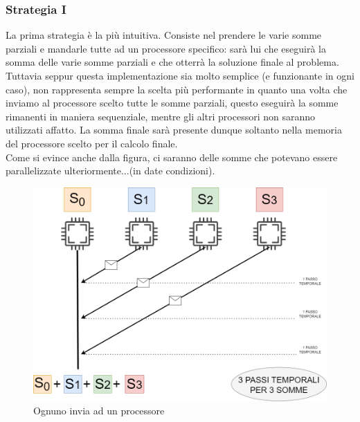 \documentclass{article}
\begin{document}
\subsubsection{Strategia I}
    La prima strategia è la più intuitiva.
    Consiste nel prendere le varie somme parziali e mandarle tutte ad un processore specifico: sarà lui che eseguirà la somma delle varie somme parziali e che otterrà la soluzione finale al problema.
    Tuttavia seppur questa implementazione sia molto semplice (e funzionante in ogni caso), non rappresenta sempre la scelta più performante in quanto una volta che inviamo al processore scelto tutte le somme parziali, questo eseguirà la somme rimanenti in maniera sequenziale, mentre gli altri processori non saranno utilizzati affatto. La somma finale sarà presente dunque soltanto nella memoria del processore scelto per il calcolo finale.\\
    Come si evince anche dalla figura, ci saranno delle somme che potevano essere parallelizzate ulteriormente...(in date condizioni). 

    \begin{figure}
        \centering
        \includegraphics[width=1\linewidth]{strategia_I.drawio.png}
        \caption{Ognuno invia ad un processore}
        \label{fig:enter-label}
    \end{figure}
\end{document}
